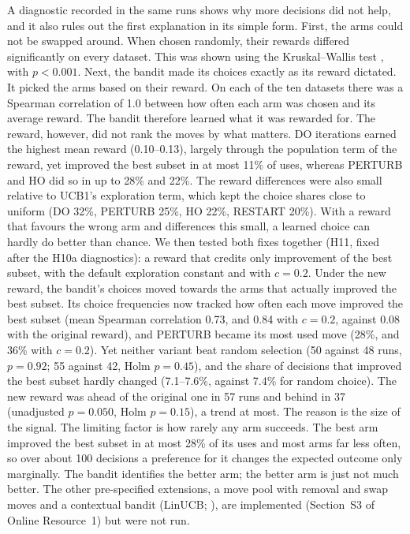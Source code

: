\documentclass[pdflatex,sn-basic]{sn-jnl}
\begin{document}
A diagnostic recorded in the same runs shows why more decisions did not help, and it also rules out the first explanation in its simple form. First, the arms could not be swapped around. When chosen randomly, their rewards differed significantly on every dataset. This was shown using the Kruskal--Wallis test \citep{kruskal1952}, with $p<0.001$. Next, the bandit made its choices exactly as its reward dictated. It picked the arms based on their reward. On each of the ten datasets there was a Spearman correlation \citep{spearman1904} of 1.0 between how often each arm was chosen and its average reward. The bandit therefore learned what it was rewarded for. The reward, however, did not rank the moves by what matters. DO iterations earned the highest mean reward (0.10--0.13), largely through the population term of the reward, yet improved the best subset in at most 11\% of uses, whereas PERTURB and HO did so in up to 28\% and 22\%. The reward differences were also small relative to UCB1's exploration term, which kept the choice shares close to uniform (DO 32\%, PERTURB 25\%, HO 22\%, RESTART 20\%). With a reward that favours the wrong arm and differences this small, a learned choice can hardly do better than chance. We then tested both fixes together (H11, fixed after the H10a diagnostics): a reward that credits only improvement of the best subset, with the default exploration constant and with $c=0.2$. Under the new reward, the bandit's choices moved towards the arms that actually improved the best subset. Its choice frequencies now tracked how often each move improved the best subset (mean Spearman correlation 0.73, and 0.84 with $c=0.2$, against 0.08 with the original reward), and PERTURB became its most used move (28\%, and 36\% with $c=0.2$). Yet neither variant beat random selection (50 against 48 runs, $p=0.92$; 55 against 42, Holm $p=0.45$), and the share of decisions that improved the best subset hardly changed (7.1--7.6\%, against 7.4\% for random choice). The new reward was ahead of the original one in 57 runs and behind in 37 (unadjusted $p=0.050$, Holm $p=0.15$), a trend at most. The reason is the size of the signal. The limiting factor is how rarely any arm succeeds. The best arm improved the best subset in at most 28\% of its uses and most arms far less often, so over about 100 decisions a preference for it changes the expected outcome only marginally. The bandit identifies the better arm; the better arm is just not much better. The other pre-specified extensions, a move pool with removal and swap moves and a contextual bandit (LinUCB; \citealp{li2010linucb}), are implemented (Section~S3 of Online Resource~1) but were not run.
\end{document}
